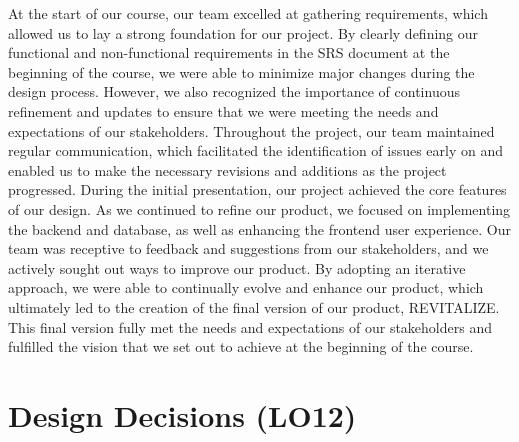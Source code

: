 \documentclass{article}
\begin{document}
At the start of our course, our team excelled at gathering requirements, which allowed us to lay a strong foundation for our project. By clearly defining our functional and non-functional requirements in the SRS document at the beginning of the course, we were able to minimize major changes during the design process. However, we also recognized the importance of continuous refinement and updates to ensure that we were meeting the needs and expectations of our stakeholders. Throughout the project, our team maintained regular communication, which facilitated the identification of issues early on and enabled us to make the necessary revisions and additions as the project progressed. During the initial presentation, our project achieved the core features of our design. As we continued to refine our product, we focused on implementing the backend and database, as well as enhancing the frontend user experience. Our team was receptive to feedback and suggestions from our stakeholders, and we actively sought out ways to improve our product. By adopting an iterative approach, we were able to continually evolve and enhance our product, which ultimately led to the creation of the final version of our product, REVITALIZE. This final version fully met the needs and expectations of our stakeholders and fulfilled the vision that we set out to achieve at the beginning of the course.

\section{Design Decisions (LO12)}

\end{document}

